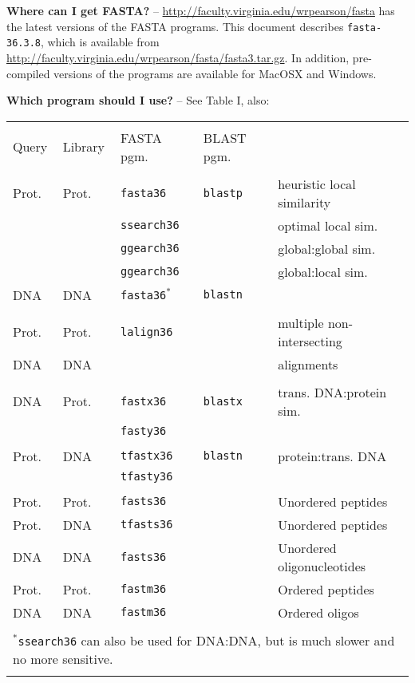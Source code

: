 \documentclass[11pt]{article}
\newcommand{\CURRENT}{fasta-36.3.8}
\begin{document}
{\noindent}\textbf{Where can I get FASTA?} --
\url{http://faculty.virginia.edu/wrpearson/fasta} has the latest
versions of the FASTA programs.  This document describes
\texttt{\CURRENT}, which is available from
\url{http://faculty.virginia.edu/wrpearson/fasta/fasta3.tar.gz}.
In addition, pre-compiled versions of the programs are available for
MacOSX and Windows.

{\noindent}\textbf{Which program should I use?} -- See Table I, also:\\

\begin{tabular}{l l l l l }
\hline \\[-1.0ex]
Query & Library & FASTA pgm. & BLAST pgm. & \\[1.2ex]
\hline \\[-1.0ex]
Prot. & Prot. & \texttt{fasta36} & \texttt{blastp} & heuristic local similarity \\
 &  & \texttt{ssearch36} &  & optimal local sim.\\
 &  & \texttt{ggearch36} &  & global:global sim. \\
 &  & \texttt{ggearch36} &  & global:local sim.\\
DNA & DNA & \texttt{fasta36}$^*$ & \texttt{blastn} & \\[1.2ex]
\hline \\[-1.0ex]
Prot. & Prot. & \texttt{lalign36} & & multiple non-intersecting \\
DNA & DNA & & & alignments \\[1.2ex]
\hline \\[-1.0ex]
DNA & Prot. & \texttt{fastx36} & \texttt{blastx} & trans. DNA:protein sim. \\ 
 &  & \texttt{fasty36} & & \\[1.2ex]
\hline \\[-1.0ex]
Prot. & DNA & \texttt{tfastx36} & \texttt{blastn} & protein:trans. DNA \\
 &  & \texttt{tfasty36} & & \\[1.2ex]
\hline \\[-1.0ex]
Prot. & Prot. & \texttt{fasts36} & & Unordered peptides \\
Prot. & DNA & \texttt{tfasts36} & & Unordered peptides \\
DNA & DNA & \texttt{fasts36} & & Unordered oligonucleotides \\
Prot. & Prot. & \texttt{fastm36} & & Ordered peptides \\
DNA & DNA & \texttt{fastm36} & & Ordered oligos \\[1.2 ex]
\hline \\[-1.0ex]
\multicolumn{5}{l}{$^*$\texttt{ssearch36} can also be used for DNA:DNA, but is much slower and no more sensitive.}\\[0.2ex]
\hline \\
\end{tabular}
\end{document}
